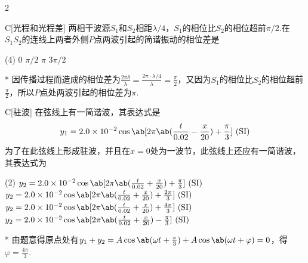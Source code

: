 \begin{paracol}{2}
    \begin{choice}{C}[光程和光程差]
        两相干波源$S_1$和$S_2$相距$\lambda/4$，$S_1$的相位比$S_2$的相位超前$\pi/2$.在$S_1S_2$的连线上两者外侧$P$点两波引起的简谐振动的相位差是
\begin{tasks}(4)
    \task $0$
    \task $\pi/2$
    \task $\pi$
    \task $3\pi/2$
\end{tasks}        
    \end{choice}
\switchcolumn\centering
\vfill
{}
\vfill
\end{paracol}
\begin{solution}*
    因传播过程而造成的相位差为$\frac{2\pi\delta}{\lambda}=\frac{2\pi\cdot\lambda/4}{\lambda}=\frac{\pi}{2}$，又因为$S_1$的相位比$S_2$的相位超前$\frac{\pi}{2}$，所以$P$点处两波引起的相位差为$\pi$.
\end{solution}

\begin{choice}{C}[驻波]
    在弦线上有一简谐波，其表达式是
    \[y_1=2.0\times 10^{-2}\cos{\ab[2\pi\ab(\frac{t}{0.02}-\frac{x}{20})+\frac{\pi}{3}]}\ (\mathrm{SI})\]
    为了在此弦线上形成驻波，并且在$x=0$处为一波节，此弦线上还应有一简谐波，其表达式为
    \begin{tasks}(2)
        \task $y_2=2.0\times 10^{-2}\cos{\ab[2\pi\ab(\frac{t}{0.02}+\frac{x}{20})+\frac{\pi}{3}]}\ (\mathrm{SI})$
        \task $y_2=2.0\times 10^{-2}\cos{\ab[2\pi\ab(\frac{t}{0.02}+\frac{x}{20})+\frac{2\pi}{3}]}\ (\mathrm{SI})$
        \task $y_2=2.0\times 10^{-2}\cos{\ab[2\pi\ab(\frac{t}{0.02}+\frac{x}{20})+\frac{4\pi}{3}]}\ (\mathrm{SI})$
        \task $y_2=2.0\times 10^{-2}\cos{\ab[2\pi\ab(\frac{t}{0.02}+\frac{x}{20})-\frac{\pi}{3}]}\ (\mathrm{SI})$
    \end{tasks}
\end{choice}
\begin{solution}*
    由题意得原点处有$y_1+y_2=A\cos{\ab(\omega t+\frac{\pi}{3})}+A\cos{\ab(\omega t+\varphi)}=0$，得$\varphi=\frac{4\pi}{3}$.
\end{solution}

